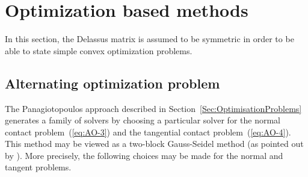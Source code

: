 


 

\section{Optimization based methods}
\label{Sec:OptimisationBasedMethods}

In this section, the Delassus matrix is assumed to be symmetric in order to be able to state simple convex optimization problems.

\subsection{Alternating optimization problem}

The Panagiotopoulos approach described in Section~\ref{Sec:OptimisationProblems} generates a family of solvers by choosing a particular solver for the normal contact problem~(\ref{eq:AO-3}) and the tangential contact problem~(\ref{eq:AO-4}). This method may be viewed as a two-block Gauss-Seidel method (as pointed out by \cite{Tzaferopoulos_CS1993}). More precisely, the following choices may be made for the normal and tangent problems.

